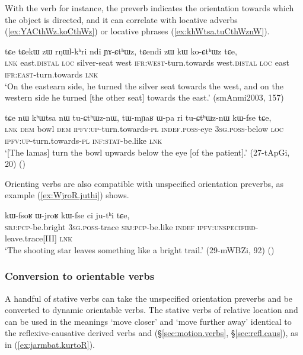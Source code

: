 With the verb  for instance, the preverb indicates the orientation towards which the object is directed, and it can correlate with locative adverbs (\ref{ex:YACthWz.koCthWz}) or locative phrases (\ref{ex:khWtsa.tuCthWznW}).  

 \begin{exe}
\ex \label{ex:YACthWz.koCthWz}
\gll  tɕe tɕekɯ zɯ rŋɯl-kʰri ndi ɲɤ-ɕtʰɯz, tɕendi zɯ kɯ ko-ɕtʰɯz tɕe, \\
\textsc{lnk} east.\textsc{distal} \textsc{loc} silver-seat west \textsc{ifr}:\textsc{west}-turn.towards west.\textsc{distal} \textsc{loc} east \textsc{ifr}:\textsc{east}-turn.towards  \textsc{lnk} \\
\glt `On the eastearn side, he turned the silver seat towards the west, and on the western side he turned [the other seat] towards the east.' (smAnmi2003, 157)
 \end{exe}
 
\begin{exe}
\ex \label{ex:khWtsa.tuCthWznW}
\gll  tɕe nɯ kʰɯtsa nɯ tu-ɕtʰɯz-nɯ, tɯ-mɲaʁ ɯ-pa ri tu-ɕtʰɯz-nɯ kɯ-fse tɕe, \\
\textsc{lnk} \textsc{dem} bowl \textsc{dem} \textsc{ipfv}:\textsc{up}-turn.towards-\textsc{pl} \textsc{indef}.\textsc{poss}-eye \textsc{3sg}.\textsc{poss}-below \textsc{loc}  \textsc{ipfv}:\textsc{up}-turn.towards-\textsc{pl} \textsc{inf}:\textsc{stat}-be.like \textsc{lnk} \\
 \glt `[The lamas] turn the bowl upwards below the eye [of the patient].' (27-tApGi, 20)
()
\end{exe}

Orienting verbs are also compatible with unspecified orientation preverbs, as example (\ref{ex:WjroR.juthi}) shows.

\begin{exe}
\ex \label{ex:WjroR.juthi}
\gll   kɯ-fsoʁ ɯ-jroʁ kɯ-fse ci ju-tʰi tɕe, \\
\textsc{sbj}:\textsc{pcp}-be.bright \textsc{3sg}.\textsc{poss}-trace \textsc{sbj}:\textsc{pcp}-be.like \textsc{indef} \textsc{ipfv}:\textsc{unspecified}-leave.trace[III] \textsc{lnk} \\
\glt `The shooting star leaves something like a bright trail.' (29-mWBZi, 92)
()
  \end{exe}
  
\subsubsection{Conversion to orientable verbs} \label{sec:convertion.orientable.verbs}
A handful of stative verbs can take the unspecified orientation preverbs and be converted to dynamic orientable verbs. The stative verbs of relative location  and   can be used in the meanings `move closer' and `move further away' identical to the reflexive-causative derived verbs  and (§\ref{sec:motion.verbs}, §\ref{sec:refl.caus}), as in (\ref{ex:jarmbat.kurtoR}).

